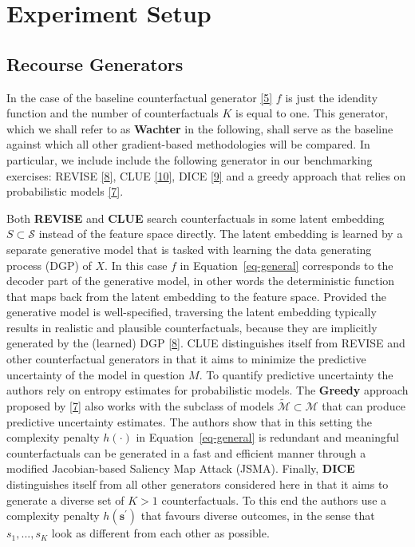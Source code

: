 \documentclass[
  conference]{IEEEtran}
\begin{document}
\hypertarget{sec-empirical}{%
\section{Experiment Setup}\label{sec-empirical}}

\hypertarget{sec-empirical-recourse}{%
\subsection{Recourse Generators}\label{sec-empirical-recourse}}

In the case of the baseline counterfactual generator
\protect\hyperlink{ref-wachter2017counterfactual}{{[}5{]}} \(f\) is just
the idendity function and the number of counterfactuals \(K\) is equal
to one. This generator, which we shall refer to as \textbf{Wachter} in
the following, shall serve as the baseline against which all other
gradient-based methodologies will be compared. In particular, we include
include the following generator in our benchmarking exercises: REVISE
\protect\hyperlink{ref-joshi2019towards}{{[}8{]}}, CLUE
\protect\hyperlink{ref-antoran2020getting}{{[}10{]}}, DICE
\protect\hyperlink{ref-mothilal2020explaining}{{[}9{]}} and a greedy
approach that relies on probabilistic models
\protect\hyperlink{ref-schut2021generating}{{[}7{]}}.

Both \textbf{REVISE} and \textbf{CLUE} search counterfactuals in some
latent embedding \(S \subset \mathcal{S}\) instead of the feature space
directly. The latent embedding is learned by a separate generative model
that is tasked with learning the data generating process (DGP) of \(X\).
In this case \(f\) in Equation~\ref{eq-general} corresponds to the
decoder part of the generative model, in other words the deterministic
function that maps back from the latent embedding to the feature space.
Provided the generative model is well-specified, traversing the latent
embedding typically results in realistic and plausible counterfactuals,
because they are implicitly generated by the (learned) DGP
\protect\hyperlink{ref-joshi2019towards}{{[}8{]}}. CLUE distinguishes
itself from REVISE and other counterfactual generators in that it aims
to minimize the predictive uncertainty of the model in question \(M\).
To quantify predictive uncertainty the authors rely on entropy estimates
for probabilistic models. The \textbf{Greedy} approach proposed by
\protect\hyperlink{ref-schut2021generating}{{[}7{]}} also works with the
subclass of models \(\tilde{\mathcal{M}}\subset\mathcal{M}\) that can
produce predictive uncertainty estimates. The authors show that in this
setting the complexity penalty \(h(\cdot)\) in Equation~\ref{eq-general}
is redundant and meaningful counterfactuals can be generated in a fast
and efficient manner through a modified Jacobian-based Saliency Map
Attack (JSMA). Finally, \textbf{DICE} distinguishes itself from all
other generators considered here in that it aims to generate a diverse
set of \(K>1\) counterfactuals. To this end the authors use a complexity
penalty \(h(\mathbf{s}^\prime)\) that favours diverse outcomes, in the
sense that \(s_1, ... , s_K\) look as different from each other as
possible.
\end{document}
